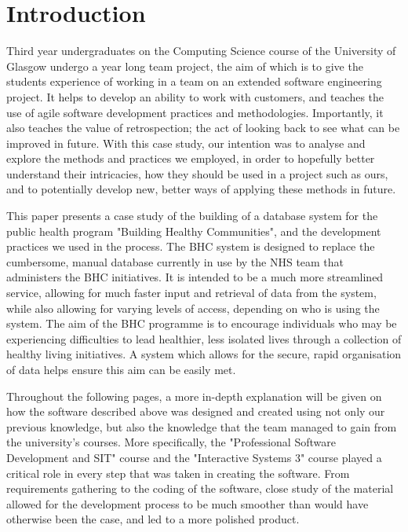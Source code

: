 \documentclass{l3proj}
\begin{document}
\educationalconsent

\newpage
\section{Introduction}
Third year undergraduates on the Computing Science course of the University of Glasgow undergo a year long team project, the aim of which is to give the students experience of working in a team on an extended software engineering project. It helps to develop an ability to work with customers, and teaches the use of agile software development practices and methodologies. Importantly, it also teaches the value of retrospection; the act of looking back to see what can be improved in future. With this case study, our intention was to analyse and explore the methods and practices we employed, in order to hopefully better understand their intricacies, how they should be used in a project such as ours, and to potentially develop new, better ways of applying these methods in future.

This paper presents a case study of the building of a database system for the public health program "Building Healthy Communities", and the development practices we used in the process. The BHC system is designed to replace the cumbersome, manual database currently in use by the NHS team that administers the BHC initiatives. It is intended to be a much more streamlined service, allowing for much faster input and retrieval of data from the system, while also allowing for varying levels of access, depending on who is using the system. The aim of the BHC programme is to encourage individuals who may be experiencing difficulties to lead healthier, less isolated lives through a collection of healthy living initiatives. A system which allows for the secure, rapid organisation of data helps ensure this aim can be easily met.

Throughout the following pages, a more in-depth explanation will be given on how the software described above was designed and created using not only our previous knowledge, but also the knowledge that the team managed to gain from the university's courses. More specifically, the "Professional Software Development and SIT" course and the "Interactive Systems 3" course played a critical role in every step that was taken in creating the software. From requirements gathering to the coding of the software, close study of the material allowed for the development process to be much smoother than would have otherwise been the case, and led to a more polished product.
\end{document}

